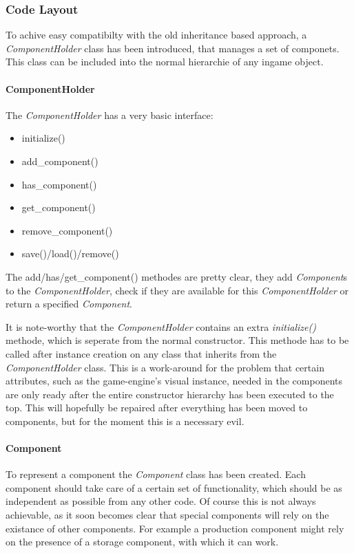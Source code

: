 \subsubsection{Code Layout}
To achive easy compatibilty with the old inheritance based approach, a \textit{ComponentHolder} class has been
introduced, that manages a set of componets. This class can be included into the normal hierarchie of any ingame object.

\paragraph{ComponentHolder}
The \textit{ComponentHolder} has a very basic interface:
\begin{itemize}
    \item initialize()
    \item add\_component()
    \item has\_component()
    \item get\_component()
    \item remove\_component()
    \item save()/load()/remove()
\end{itemize}
The add/has/get\_component() methodes are pretty clear, they add \textit{Component}s to the \textit{ComponentHolder}, check if
they are available for this \textit{ComponentHolder} or return a specified \textit{Component}.

It is note-worthy that the \textit{ComponentHolder} contains an extra \textit{initialize()} methode, which is seperate from the
normal constructor. This methode has to be called after instance creation on any class that inherits from the
\textit{ComponentHolder} class. This is a work-around for the problem that certain attributes, such as the game-engine's
visual instance, needed in the components are only ready after the entire constructor hierarchy has been executed to the
top. This will hopefully be repaired after everything has been moved to components, but for the moment this is a
necessary evil.

\paragraph{Component}
To represent a component the \textit{Component} class has been created. Each component should take care of a certain set
of functionality, which should be as independent as possible from any other code. Of course this is not always
achievable, as it soon becomes clear that special components will rely on the existance of other components. For example
a production component might rely on the presence of a storage component, with which it can work.

